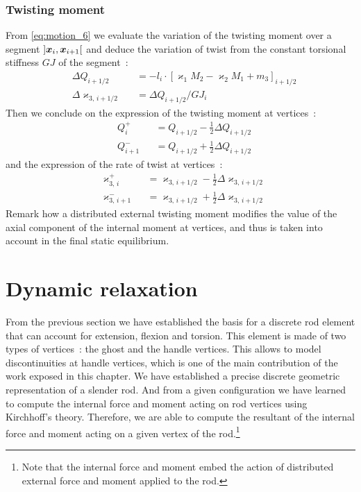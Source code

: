 \subsubsection{Twisting moment}
From \cref{eq:motion_6} we evaluate the variation of the twisting moment over a segment $]\boldsymbol{x}_{i},  \boldsymbol{x}_{i+1}[$ and deduce the variation of twist from the constant torsional stiffness $GJ$ of the segment~: 
\begin{subequations}
	\begin{alignat}{2}
		&\Delta Q_{i+1/2} &&= -l_i  \cdot {[\varkappa_1 M_2 - \varkappa_2 M_1 + m_3]}_{i+1/2}
		\label{eq:DeltaQ}
		\\
		&\Delta \varkappa_{3,\,i+1/2} &&= \Delta Q_{i+1/2} / {GJ}_i
	\end{alignat}
\end{subequations}
Then we conclude on the expression of the twisting moment at vertices~:
\begin{subequations}
	\begin{alignat}{2}
		&Q_{i}^{+} &&= Q_{i+1/2} - \frac{1}{2} \Delta Q_{i+1/2}  \\[0.5em]
		&Q_{i+1}^{-} &&= Q_{i+1/2} + \frac{1}{2} \Delta Q_{i+1/2}
	\end{alignat}
	\label{eq:dQi}
\end{subequations}
and the expression of the rate of twist at vertices~:
\begin{subequations}
	\begin{alignat}{2}
		&\varkappa_{3,\,i}^{+} &&= \varkappa_{3,\,i+1/2} - \frac{1}{2} \Delta \varkappa_{3,\,i+1/2}  \\[0.5em]
		&\varkappa_{3,\,i+1}^{-} &&= \varkappa_{3,\,i+1/2} + \frac{1}{2} \Delta \varkappa_{3,\,i+1/2}
	\end{alignat}
\end{subequations}
Remark how a distributed external twisting moment modifies the value of the axial component of the internal moment at vertices, and thus is taken into account in the final static equilibrium.







\clearpage
\section{Dynamic relaxation}
From the previous section we have established the basis for a discrete rod element that can account for extension, flexion and torsion. This element is made of two types of vertices~: the ghost and the handle vertices. This allows to model discontinuities at handle vertices, which is one of the main contribution of the work exposed in this chapter. We have established a precise discrete geometric representation of a slender rod. And from a given configuration we have learned to compute the internal force and moment acting on rod vertices using Kirchhoff's theory. Therefore, we are able to compute the resultant of the internal force and moment acting on a given vertex of the rod.\footnote{Note that the internal force and moment embed the action of distributed external force and moment applied to the rod.}

